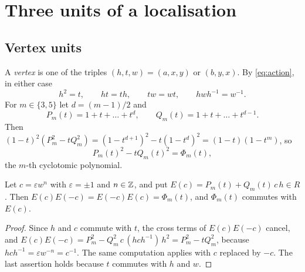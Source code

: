 \documentclass[11pt,colorlinks]{charlie}
\begin{document}
\section{Three units of a localisation}\label{sec:letters}

\subsection{Vertex units}
A \emph{vertex} is one of the triples $(h,t,w)=(a,x,y)$ or $(b,y,x)$. By \eqref{eq:action}, in either case
\[
  h^2=t,\qquad ht=th,\qquad tw=wt,\qquad hwh^{-1}=w^{-1}.
\]
For $m\in\{3,5\}$ let $d=(m-1)/2$ and
\[
  P_m(t)=1+t+\dots+t^{d},\qquad Q_m(t)=1+t+\dots+t^{d-1}.
\]
Then $(1-t)^2(P_m^2-tQ_m^2)=(1-t^{d+1})^2-t(1-t^d)^2=(1-t)(1-t^m)$, so
\begin{equation}\label{eq:pell}
  P_m(t)^2-tQ_m(t)^2=\Phi_m(t),
\end{equation}
the $m$-th cyclotomic polynomial.

\begin{lemma}\label{lem:atom}
Let $c=\varepsilon w^n$ with $\varepsilon=\pm1$ and $n\in\mathbb{Z}$, and put $E(c)=P_m(t)+Q_m(t)\,c\,h\in R$. Then $E(c)E(-c)=E(-c)E(c)=\Phi_m(t)$, and $\Phi_m(t)$ commutes with $E(c)$.
\end{lemma}

\begin{proof}
Since $h$ and $c$ commute with $t$, the cross terms of $E(c)E(-c)$ cancel, and $E(c)E(-c)=P_m^2-Q_m^2\,c\,(hch^{-1})\,h^2=P_m^2-tQ_m^2$, because $hch^{-1}=\varepsilon w^{-n}=c^{-1}$. The same computation applies with $c$ replaced by $-c$. The last assertion holds because $t$ commutes with $h$ and $w$.
\end{proof}
\end{document}

